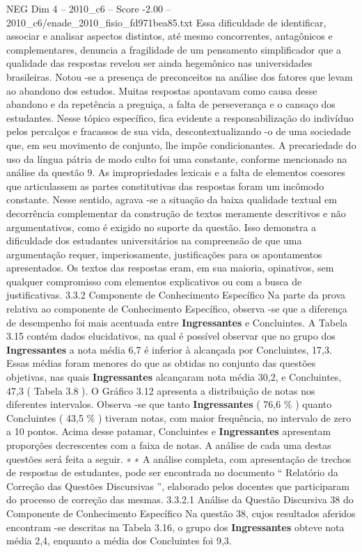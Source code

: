 \begin{textsample}{NEG Dim 4 – 2010\_c6 – Score -2.00 – 2010\_c6/enade\_2010\_fisio\_fd971bea85.txt}
Essa dificuldade de identificar, associar e analisar aspectos distintos, até mesmo concorrentes, antagônicos e complementares, denuncia a fragilidade de um pensamento simplificador que a qualidade das respostas revelou ser ainda hegemônico nas universidades brasileiras.
Notou -se a presença de preconceitos na análise dos fatores que levam ao abandono dos estudos.
Muitas respostas apontavam como causa desse abandono e da repetência a preguiça, a falta de perseverança e o cansaço dos estudantes.
Nesse tópico específico, fica evidente a responsabilização do indivíduo pelos percalços e fracassos de sua vida, descontextualizando -o de uma sociedade que, em seu movimento de conjunto, lhe impõe condicionantes.
A precariedade do uso da língua pátria de modo culto foi uma constante, conforme mencionado na análise da questão 9.
As impropriedades lexicais e a falta de elementos coesores que articulassem as partes constitutivas das respostas foram um incômodo constante.
Nesse sentido, agrava -se a situação da baixa qualidade textual em decorrência complementar da construção de textos meramente descritivos e não argumentativos, como é exigido no suporte da questão.
Isso demonstra a dificuldade dos estudantes universitários na compreensão de que uma argumentação requer, imperiosamente, justificações para os apontamentos apresentados.
Os textos das respostas eram, em sua maioria, opinativos, sem qualquer compromisso com elementos explicativos ou com a busca de justificativas. 3.3.2 Componente de Conhecimento Específico Na parte da prova relativa ao componente de Conhecimento Específico, observa -se que a diferença de desempenho foi mais acentuada entre \textbf{Ingressantes} e Concluintes.
A Tabela 3.15 contém dados elucidativos, na qual é possível observar que no grupo dos \textbf{Ingressantes} a nota média 6,7 é inferior à alcançada por Concluintes, 17,3.
Essas médias foram menores do que as obtidas no conjunto das questões objetivas, nas quais \textbf{Ingressantes} alcançaram nota média 30,2, e Concluintes, 47,3 ( Tabela 3.8 ).
O Gráfico 3.12 apresenta a distribuição de notas nos diferentes intervalos.
Observa -se que tanto \textbf{Ingressantes} ( 76,6 \% ) quanto Concluintes ( 43,5 \% ) tiveram notas, com maior frequência, no intervalo de zero a 10 pontos.
Acima desse patamar, Concluintes e \textbf{Ingressantes} apresentam proporções decrescentes com a faixa de notas.
A análise de cada uma destas questões será feita a seguir. ∗ ∗ A análise completa, com apresentação de trechos de respostas de estudantes, pode ser encontrada no documento “ Relatório da Correção das Questões Discursivas ”, elaborado pelos docentes que participaram do processo de correção das mesmas. 3.3.2.1 Análise da Questão Discursiva 38 do Componente de Conhecimento Específico Na questão 38, cujos resultados aferidos encontram -se descritas na Tabela 3.16, o grupo dos \textbf{Ingressantes} obteve nota média 2,4, enquanto a média dos Concluintes foi 9,3.

\end{textsample}
